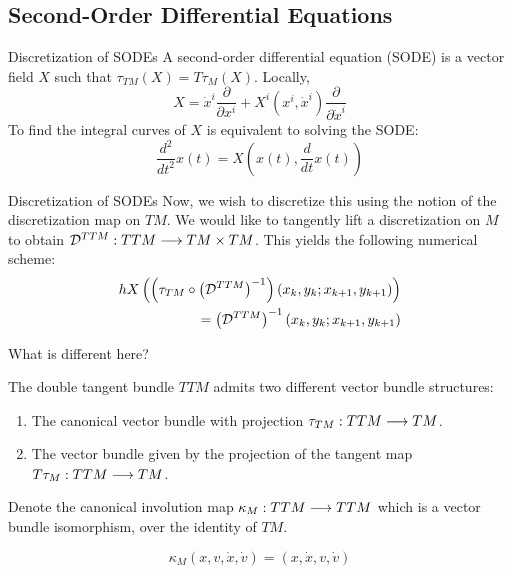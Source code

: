 \documentclass{beamer}
\begin{document}
\subsection{Second-Order Differential Equations}

\begin{frame}{Discretization of SODEs}
  A second-order differential equation (SODE) is a vector field $X$ such that $\tau_{TM}(X) = T \tau_M (X)$. Locally,
  \begin{equation}
      X = \dot{x}^i \frac{\partial}{\partial x^i} + X^i(x^i, \dot{x}^i) \frac{\partial}{\partial \dot{x}^i}
  \end{equation}
  To find the integral curves of $X$ is equivalent to solving the SODE:
  \begin{equation}
  \label{eq:sode}
      \frac{d^2}{dt^2}x(t) = X \left( x(t), \frac{d}{dt}x(t) \right) 
  \end{equation}

\end{frame}

\begin{frame}{Discretization of SODEs}
  Now, we wish to discretize this using the notion of the discretization map on $TM$. We would like to tangently lift a discretization on $M$ to obtain $\mathcal{D}^{TTM}: TTM \longrightarrow TM \times TM$. This yields the following numerical scheme:
  \begin{equation}
  \label{eq:disc}
  \begin{split}
      h X \left( \left(\tau_{TM} \circ \left(\mathcal{D}^{TTM}\right)^{-1}\right)(x_k, y_k; x_{k+1}, y_{k+1})\right) \\ = \left(\mathcal{D}^{TTM}\right)^{-1} (x_k, y_k; x_{k+1}, y_{k+1})
  \end{split}
  \end{equation}
  
\end{frame}

\begin{frame}{What is different here?}

  The double tangent bundle $TTM$ admits two different vector bundle structures:

  \begin{enumerate}
    \item The canonical vector bundle with projection $\tau_{TM} : TTM \longrightarrow TM$.
    \item The vector bundle given by the projection of the tangent map $T \tau_M : TTM \longrightarrow TM$. 
  \end{enumerate}

  \pause
  Denote the canonical involution map $\kappa_M : TTM \longrightarrow TTM$ which is a vector bundle isomorphism, over the identity of $TM$.

\[
 \kappa_M (x, v, \dot{x}, \dot{v}) = (x,\dot{x}, v, \dot{v})
\]
  
\end{frame}
\end{document}
